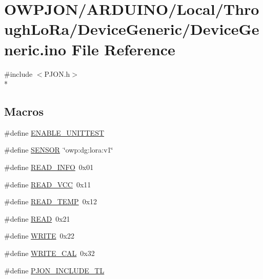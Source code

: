 \hypertarget{ARDUINO_2Local_2ThroughLoRa_2DeviceGeneric_2DeviceGeneric_8ino}{\section{O\-W\-P\-J\-O\-N/\-A\-R\-D\-U\-I\-N\-O/\-Local/\-Through\-Lo\-Ra/\-Device\-Generic/\-Device\-Generic.ino File Reference}
\label{ARDUINO_2Local_2ThroughLoRa_2DeviceGeneric_2DeviceGeneric_8ino}
}
{\ttfamily \#include $<$P\-J\-O\-N.\-h$>$}\\*
\subsection*{Macros}
\begin{DoxyCompactItemize}
\item 
\#define \hyperlink{ARDUINO_2Local_2ThroughLoRa_2DeviceGeneric_2DeviceGeneric_8ino_a133432ca7ece04b33429e0fb94544867}{E\-N\-A\-B\-L\-E\-\_\-\-U\-N\-I\-T\-T\-E\-S\-T}
\item 
\#define \hyperlink{ARDUINO_2Local_2ThroughLoRa_2DeviceGeneric_2DeviceGeneric_8ino_a84f1ead330bbcc83a63929c4726080d7}{S\-E\-N\-S\-O\-R}~\char`\"{}owp\-:dg\-:lora\-:v1\char`\"{}
\item 
\#define \hyperlink{ARDUINO_2Local_2ThroughLoRa_2DeviceGeneric_2DeviceGeneric_8ino_ae9d85efda88bdfdba5ca9fe92f557dd9}{R\-E\-A\-D\-\_\-\-I\-N\-F\-O}~0x01
\item 
\#define \hyperlink{ARDUINO_2Local_2ThroughLoRa_2DeviceGeneric_2DeviceGeneric_8ino_a3563b296d5f60635a1256e8a12261d74}{R\-E\-A\-D\-\_\-\-V\-C\-C}~0x11
\item 
\#define \hyperlink{ARDUINO_2Local_2ThroughLoRa_2DeviceGeneric_2DeviceGeneric_8ino_ac8c23082885adeec4834469b64e00bb9}{R\-E\-A\-D\-\_\-\-T\-E\-M\-P}~0x12
\item 
\#define \hyperlink{ARDUINO_2Local_2ThroughLoRa_2DeviceGeneric_2DeviceGeneric_8ino_ada74e7db007a68e763f20c17f2985356}{R\-E\-A\-D}~0x21
\item 
\#define \hyperlink{ARDUINO_2Local_2ThroughLoRa_2DeviceGeneric_2DeviceGeneric_8ino_aa10f470e996d0f51210d24f442d25e1e}{W\-R\-I\-T\-E}~0x22
\item 
\#define \hyperlink{ARDUINO_2Local_2ThroughLoRa_2DeviceGeneric_2DeviceGeneric_8ino_a9418b096dba157494f523dc01b82a760}{W\-R\-I\-T\-E\-\_\-\-C\-A\-L}~0x32
\item 
\#define \hyperlink{ARDUINO_2Local_2ThroughLoRa_2DeviceGeneric_2DeviceGeneric_8ino_aeebf956fc71944a6237c3af6a038ff70}{P\-J\-O\-N\-\_\-\-I\-N\-C\-L\-U\-D\-E\-\_\-\-T\-L}
\end{DoxyCompactItemize}
